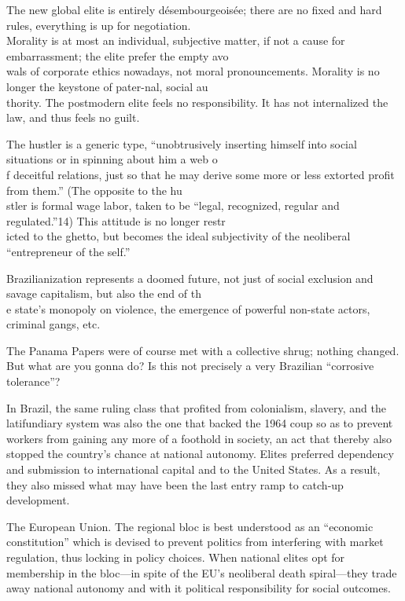 \documentclass[
]{book}
\begin{document}
The new global elite is entirely désembourgeoisée; there are no fixed and hard rules, everything is up for negotiation.\\
Morality is at most an individual, subjective matter, if not a cause for embarrassment; the elite prefer the empty avo\\
wals of corporate ethics nowadays, not moral pronouncements. Morality is no longer the keystone of pater-nal, social au\\
thority. The postmodern elite feels no responsibility. It has not internalized the law, and thus feels no guilt.

The hustler is a generic type, ``unobtrusively inserting himself into social situations or in spinning about him a web o\\
f deceitful relations, just so that he may derive some more or less extorted profit from them.'' (The opposite to the hu\\
stler is formal wage labor, taken to be ``legal, recognized, regular and regulated.''14) This attitude is no longer restr\\
icted to the ghetto, but becomes the ideal subjectivity of the neoliberal ``entrepreneur of the self.''

Brazilianization represents a doomed future, not just of social exclusion and savage capitalism, but also the end of th\\
e state's monopoly on violence, the emergence of powerful non-state actors, criminal gangs, etc.

The Panama Papers were of course met with a collective shrug; nothing changed. But what are you gonna do? Is this not precisely a very Brazilian ``corrosive tolerance''?

In Brazil, the same ruling class that profited from colonialism, slavery, and the latifundiary system was also the one that backed the 1964 coup so as to prevent workers from gaining any more of a foothold in society, an act that thereby also stopped the country's chance at national autonomy. Elites preferred dependency and sub­mission to international capital and to the United States. As a result, they also missed what may have been the last entry ramp to catch-up development.

The European Union. The regional bloc is best understood as an ``economic constitution'' which is devised to prevent politics from interfering with market regulation, thus locking in policy choices.
When national elites opt for membership in the bloc---in spite of the EU's neoliberal death spiral---they trade away national autonomy and with it political responsibility for social outcomes.
\end{document}

